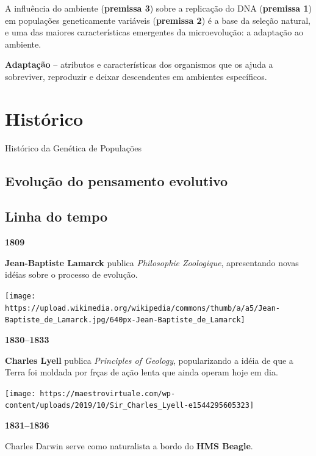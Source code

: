 \documentclass[
]{book}
\begin{document}
A influência do ambiente (\textbf{premissa 3}) sobre a replicação do DNA (\textbf{premissa 1}) em populações geneticamente variáveis (\textbf{premissa 2}) é a base da seleção natural, e uma das maiores características emergentes da microevolução: a adaptação ao ambiente.

\textbf{Adaptação} -- atributos e características dos organismos que os ajuda a sobreviver, reproduzir e deixar descendentes em ambientes específicos.

\hypertarget{histuxf3rico}{%
\chapter{Histórico}\label{histuxf3rico}}

Histórico da Genética de Populações

\hypertarget{evoluuxe7uxe3o-do-pensamento-evolutivo}{%
\section{Evolução do pensamento evolutivo}\label{evoluuxe7uxe3o-do-pensamento-evolutivo}}

\hypertarget{linha-do-tempo}{%
\section{Linha do tempo}\label{linha-do-tempo}}

\textbf{1809}

\textbf{Jean-Baptiste Lamarck} publica \emph{Philosophie Zoologique}, apresentando novas idéias sobre o processo de evolução.

\begin{flushleft}\texttt{[image: https://upload.wikimedia.org/wikipedia/commons/thumb/a/a5/Jean-Baptiste\_de\_Lamarck.jpg/640px-Jean-Baptiste\_de\_Lamarck]} \end{flushleft}

\textbf{1830--1833}

\textbf{Charles Lyell} publica \emph{Principles of Geology}, popularizando a idéia de que a Terra foi moldada por frças de ação lenta que ainda operam hoje em dia.

\begin{flushleft}\texttt{[image: https://maestrovirtuale.com/wp-content/uploads/2019/10/Sir\_Charles\_Lyell-e1544295605323]} \end{flushleft}

\textbf{1831--1836}

Charles Darwin serve como naturalista a bordo do \textbf{HMS Beagle}.
\end{document}
